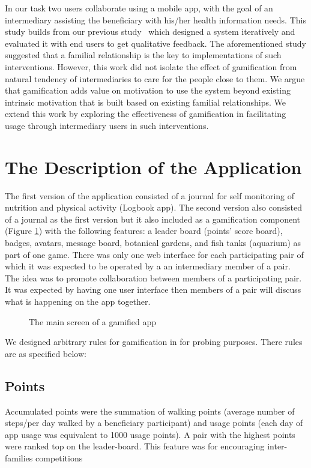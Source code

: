 \documentclass{sig-alternate}
\begin{document}
In our task two users collaborate using a mobile app, with the goal of an intermediary assisting the beneficiary with his/her health information needs. This study builds from our previous study~\cite{katule2016:leveraging} which designed a system iteratively and evaluated it with end users to get qualitative feedback. The aforementioned study suggested that a familial relationship is the key to implementations of such interventions. However, this work did not isolate the effect of gamification from natural tendency of intermediaries to care for the people close to them. We argue that gamification adds value on motivation to use the system beyond existing intrinsic motivation that is built based on existing familial relationships. We extend this work by exploring the effectiveness of gamification in facilitating usage through intermediary users in such interventions.

\section{The Description of the Application}\label{gamfeatures}
The first version of the application consisted of a journal for self monitoring of nutrition and physical activity (Logbook app). The second version also consisted of a journal as the first version but it also included as a gamification component (Figure \ref{figure:gameapp}) with the following features: a leader board (points' score board), badges, avatars, message board, botanical gardens, and fish tanks (aquarium) as part of one game.  There was only one web interface for each participating pair of which it was expected to be operated by a an intermediary member of a pair. The idea was to promote collaboration between members of a participating pair. It was expected by having one user interface then members of a pair will discuss what is happening on the app together.

\begin{figure}[H]
\centering
{}
\caption{The main screen of a gamified app}
\label{figure:gameapp}
\end{figure} 

We designed arbitrary rules for gamification in for probing purposes. There rules are as specified below:
\subsection*{\textbf{Points}}
Accumulated points were the summation of walking points (average number of steps/per day walked by a beneficiary participant) and usage points (each day of app usage was equivalent to 1000 usage points). A pair with the highest points were ranked top on the leader-board. This feature was for encouraging inter-families competitions
\end{document}
